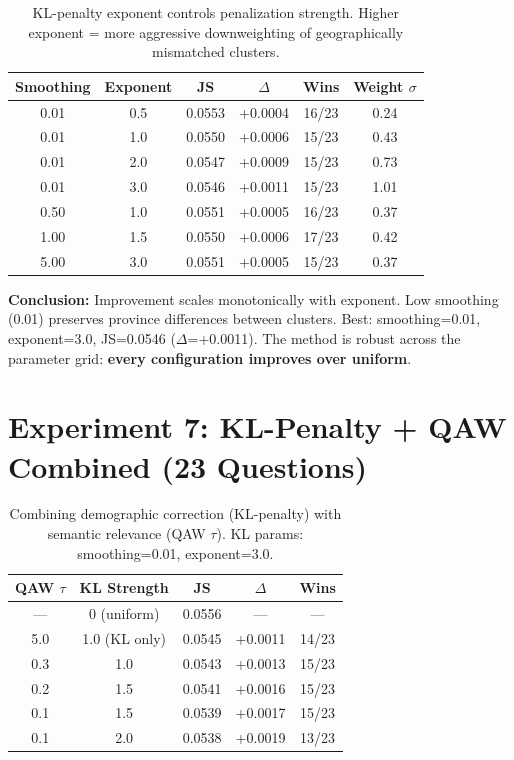 \documentclass[10pt,a4paper]{article}
\begin{document}
\begin{table}[h]
\centering\small
\caption{KL-penalty exponent controls penalization strength. Higher exponent = more aggressive downweighting of geographically mismatched clusters.}
\begin{tabular}{@{}cccccc@{}}
\toprule
Smoothing & Exponent & JS & $\Delta$ & Wins & Weight $\sigma$ \\
\midrule
0.01 & 0.5 & 0.0553 & +0.0004 & 16/23 & 0.24 \\
0.01 & 1.0 & 0.0550 & +0.0006 & 15/23 & 0.43 \\
0.01 & 2.0 & 0.0547 & +0.0009 & 15/23 & 0.73 \\
\rowcolor{best} 0.01 & 3.0 & 0.0546 & +0.0011 & 15/23 & 1.01 \\
0.50 & 1.0 & 0.0551 & +0.0005 & 16/23 & 0.37 \\
1.00 & 1.5 & 0.0550 & +0.0006 & 17/23 & 0.42 \\
5.00 & 3.0 & 0.0551 & +0.0005 & 15/23 & 0.37 \\
\bottomrule
\end{tabular}
\end{table}

\textbf{Conclusion:} Improvement scales monotonically with exponent. Low smoothing (0.01) preserves province differences between clusters. Best: smoothing=0.01, exponent=3.0, JS=0.0546 ($\Delta$=+0.0011). The method is robust across the parameter grid: \textbf{every configuration improves over uniform}.

\section{Experiment 7: KL-Penalty + QAW Combined (23 Questions)}

\begin{table}[h]
\centering\small
\caption{Combining demographic correction (KL-penalty) with semantic relevance (QAW $\tau$). KL params: smoothing=0.01, exponent=3.0.}
\begin{tabular}{@{}ccccc@{}}
\toprule
QAW $\tau$ & KL Strength & JS & $\Delta$ & Wins \\
\midrule
--- & 0 (uniform) & 0.0556 & --- & --- \\
5.0 & 1.0 (KL only) & 0.0545 & +0.0011 & 14/23 \\
0.3 & 1.0 & 0.0543 & +0.0013 & 15/23 \\
0.2 & 1.5 & 0.0541 & +0.0016 & 15/23 \\
0.1 & 1.5 & 0.0539 & +0.0017 & 15/23 \\
\rowcolor{best} 0.1 & 2.0 & 0.0538 & +0.0019 & 13/23 \\
\bottomrule
\end{tabular}
\end{table}
\end{document}
